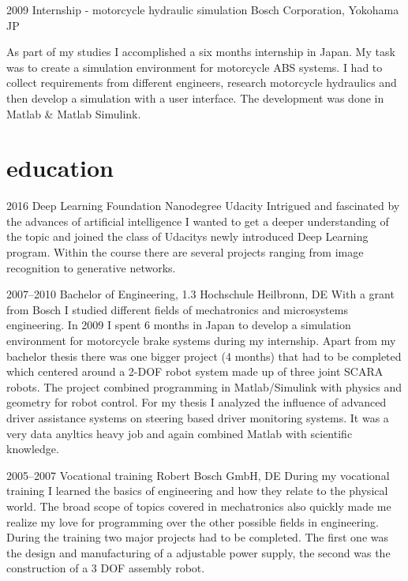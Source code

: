 \documentclass[]{friggeri-cv} %
\begin{document}
\begin{entrylist}
\entry
{2009}
{Internship - motorcycle hydraulic simulation}
{Bosch Corporation, Yokohama JP}
{As part of my studies I accomplished a six months internship in Japan. My task was to create a simulation environment for motorcycle ABS systems. I had to collect requirements from different engineers, research motorcycle hydraulics and then develop a simulation with a user interface. The development was done in Matlab \& Matlab Simulink.

}
\end{entrylist}

\newpage
\section{\color{blue}education}

\begin{entrylist}

\entry
{2016}
{Deep Learning {\normalfont Foundation Nanodegree}}
{Udacity}
{Intrigued and fascinated by the advances of artificial intelligence I wanted to get a deeper understanding of the topic and joined the class of Udacitys newly introduced Deep Learning program. Within the course there are several projects ranging from image recognition to generative networks.}

\entry
{2007--2010}
{Bachelor {\normalfont of Engineering}, 1.3}
{Hochschule Heilbronn, DE}
{With a grant from Bosch I studied different fields of mechatronics and microsystems engineering. In 2009 I spent 6 months in Japan to develop a simulation environment for motorcycle brake systems during my internship. Apart from my bachelor thesis there was one bigger project (4 months) that had to be completed which centered around a 2-DOF robot system made up of three joint SCARA robots. The project combined programming in Matlab/Simulink with physics and geometry for robot control. 
For my thesis I analyzed the influence of advanced driver assistance systems on steering based driver monitoring systems. It was a very data anyltics heavy job and again combined Matlab with scientific knowledge.
}

\entry
{2005--2007}
{Vocational training}
{Robert Bosch GmbH, DE}
{During my vocational training I learned the basics of engineering and how they relate to the physical world. The broad scope of topics covered in mechatronics also quickly made me realize my love for programming over the other possible fields in engineering. During the training two major projects had to be completed. The first one was the design and manufacturing of a adjustable power supply, the second was the construction of a 3 DOF assembly robot.
}
\end{entrylist}
\end{document}
